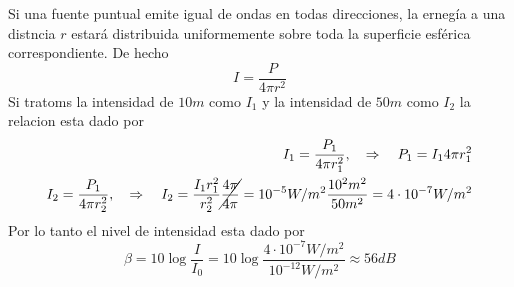Si una fuente puntual emite igual de ondas en todas direcciones, la ernegía a
una distncia $r$ estará distribuida uniformemente sobre toda la superficie
esférica correspondiente. De hecho
$$
	I = \frac{P}{4 \pi r^2} 
$$
Si tratoms la intensidad de $10m$ como $I_1$ y la intensidad de $50m$ como $I_2$
la relacion esta dado por
\begin{align*}
	I_1 = \frac{P_1}{4 \pi r_1^2}, \quad \Rightarrow \quad P_1 = I_1 4\pi r_1^2
\\
	I_2 = \frac{P_1}{4 \pi r_2^2}, \quad \Rightarrow \quad I_2 = \frac{I_1
r_1^2}{r_2^2} \cancel{\frac{4 \pi}{4 \pi}} = 10^{-5} W/m^2 \frac{10^2 m^2}{50 m^2} =
4\cdot 10^{-7} W/m^2
\end{align*}
Por lo tanto el nivel de intensidad esta dado por
$$
	\beta = 10 \log \frac{I}{I_0} = 10 \log \frac{4 \cdot 10^{-7}
W/m^2}{10^{-12}W/m^2} \approx 56 dB
$$

